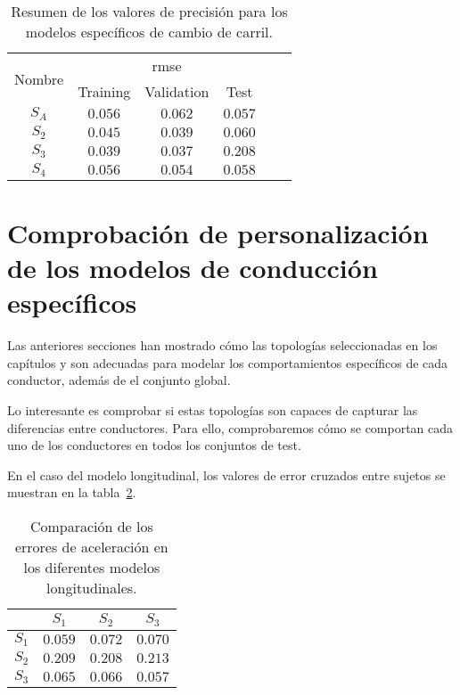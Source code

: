 \begin{table}
	\centering
	\caption[Resumen de los valores de precisión para los modelos específicos de cambio de carril]{Resumen de los valores de precisión para los modelos específicos de cambio de carril.}
	\label{tbl:lc-specific-accuracy}
	\begin{tabular}{cccccc}
		\hline
		\multirow{2}{*}{Nombre} & \multicolumn{3}{c}{\ac{rmse}}      \\ 
		& Training & Validation & Test \\ \hline
		$S_A$ & $0.056$ & $0.062$ & $0.057$  \\
		$S_2$ & $0.045$ & $0.039$ & $0.060$  \\
		$S_3$ & $0.039$ & $0.037$ & $0.208$  \\
		$S_4$ & $0.056$ & $0.054$ & $0.058$  \\ \hline
	\end{tabular}
\end{table}


\section{Comprobación de personalización de los modelos de conducción específicos}

Las anteriores secciones han mostrado cómo las topologías seleccionadas en los capítulos  y  son adecuadas para modelar los comportamientos específicos de cada conductor, además de el conjunto global.

Lo interesante es comprobar si estas topologías son capaces de capturar las diferencias entre conductores. Para ello, comprobaremos cómo se comportan cada uno de los conductores en todos los conjuntos de test.

En el caso del modelo longitudinal, los valores de error cruzados entre sujetos se muestran en la tabla~\ref{tbl:lm-subjects-comparison}.

\begin{table}[]
	\centering
	\caption[Comparación de los errores de aceleración en los diferentes modelos longitudinales]{Comparación de los errores de aceleración en los diferentes modelos longitudinales. }
	\label{tbl:lm-subjects-comparison}
	\begin{tabular}{c|ccc}
		               & \textbf{$S_1$} & \textbf{$S_2$} & \textbf{$S_3$} \\ \hline
		\textbf{$S_1$} & $0.059$        & $0.072$        & $0.070$ \\
		\textbf{$S_2$} & $0.209$        & $0.208$        & $0.213$ \\
		\textbf{$S_3$} & $0.065$        & $0.066$        & $0.057$ \\ \hline
	\end{tabular}
\end{table}

